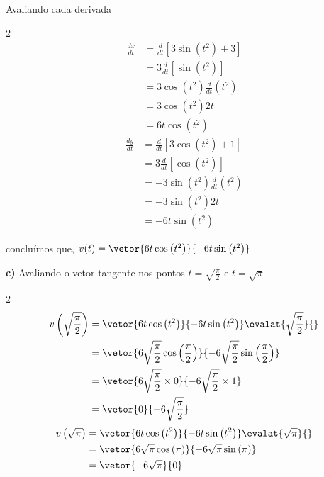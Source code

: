 \documentclass[a4paper,12pt,fleqn]{article}
\begin{document}
\begin{answer}
  Avaliando cada derivada
  \begin{multicols}{2}
    \begin{align*}
      \frac{dx}{dt}
      & = \frac{d}{dt}\left[3 \sin\left(t^2\right) +3\right]   \\[2mm]
      & = 3 \frac{d}{dt}\left[\sin\left(t^2\right)\right]      \\[2mm]
      & = 3 \cos\left(t^2\right) \frac{d}{dt}\left(t^2\right)  \\[2mm]
      & = 3 \cos\left(t^2\right) 2t                            \\[2mm]
      & = 6 t \cos\left(t^2\right)
    \end{align*}
    \begin{align*}
      \frac{dy}{dt}
      & = \frac{d}{dt}\left[3 \cos\left(t^2\right) +1\right] \\[2mm]
      & = 3\frac{d}{dt}\left[\cos\left(t^2\right)\right]     \\[2mm]
      & = -3\sin\left(t^2\right)\frac{d}{dt}\left(t^2\right) \\[2mm]
      & = -3\sin\left(t^2\right)2t \\[2mm]
      & = -6t \sin\left(t^2\right)
    \end{align*}
  \end{multicols}
  concluímos que,
  \(
  v(t) = \vetor%
  { 6t \cos\left(t^2\right)}
  {-6t \sin\left(t^2\right)}
  \)

  \bigskip
  \textbf{c)} \quad
  Avaliando o vetor tangente nos pontos
  $t=\sqrt{\frac{\pi}{2}}$ e $t=\sqrt{\pi}$
  \begin{multicols}{2}
    \begin{align*}
      v\left(\sqrt{\frac{\pi}{2}}\right)
      & = \vetor
      { 6t \cos\left(t^2\right)}
      {-6t \sin\left(t^2\right)}
      \evalat{\sqrt{\frac{\pi}{2}}}{} \\
      & = \vetor
      { 6\sqrt{\frac{\pi}{2}} \cos\left(\frac{\pi}{2}\right)}
      {-6\sqrt{\frac{\pi}{2}} \sin\left(\frac{\pi}{2}\right)}
      \\
      & = \vetor
      { 6\sqrt{\frac{\pi}{2}} \times 0}
      {-6\sqrt{\frac{\pi}{2}} \times 1}
      \\
      & = \vetor{0}{-6\sqrt{\frac{\pi}{2}}}
    \end{align*}
    \newcolumn
    \begin{align*}
      v\left(\sqrt{\pi}\right)
      & = \vetor
      { 6t \cos\left(t^2\right)}
      {-6t \sin\left(t^2\right)}
      \evalat{\sqrt{\pi}}{} \\
      & = \vetor
      { 6\sqrt{\pi} \cos\left(\pi\right)}
      {-6\sqrt{\pi} \sin\left(\pi\right)}
      \\
      & = \vetor{-6\sqrt{\pi}}{0}
    \end{align*}
  \end{multicols}
\end{answer}
\end{document}
